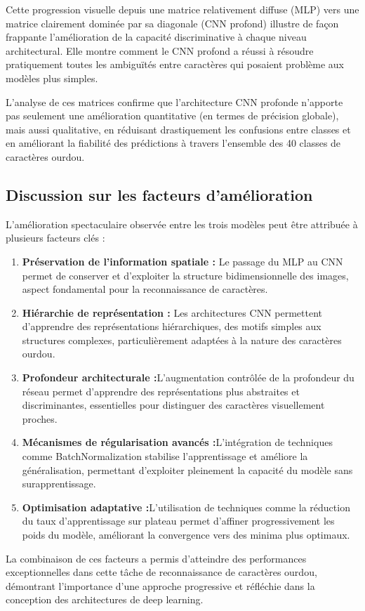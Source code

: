 \begin{flushleft}
\bigskip 

Cette progression visuelle depuis une matrice relativement diffuse (MLP) vers une matrice clairement dominée par sa diagonale (CNN profond) illustre de façon frappante l'amélioration de la capacité discriminative à chaque niveau architectural. Elle montre comment le CNN profond a réussi à résoudre pratiquement toutes les ambiguïtés entre caractères qui posaient problème aux modèles plus simples.

L'analyse de ces matrices confirme que l'architecture CNN profonde n'apporte pas seulement une amélioration quantitative (en termes de précision globale), mais aussi qualitative, en réduisant drastiquement les confusions entre classes et en améliorant la fiabilité des prédictions à travers l'ensemble des 40 classes de caractères ourdou.
\end{flushleft}

\subsection{Discussion sur les facteurs d'amélioration}

\begin{flushleft}
L'amélioration spectaculaire observée entre les trois modèles peut être attribuée à plusieurs facteurs clés :

\begin{enumerate}
\item \textbf{Préservation de l'information spatiale :} Le passage du MLP au CNN permet de conserver et d'exploiter la structure bidimensionnelle des images, aspect fondamental pour la reconnaissance de caractères.
\item \textbf{Hiérarchie de représentation : }Les architectures CNN permettent d'apprendre des représentations hiérarchiques, des motifs simples aux structures complexes, particulièrement adaptées à la nature des caractères ourdou.
\item \textbf{Profondeur architecturale :}L'augmentation contrôlée de la profondeur du réseau permet d'apprendre des représentations plus abstraites et discriminantes, essentielles pour distinguer des caractères visuellement proches.
\item \textbf{Mécanismes de régularisation avancés :}L'intégration de techniques comme BatchNormalization stabilise l'apprentissage et améliore la généralisation, permettant d'exploiter pleinement la capacité du modèle sans surapprentissage.
\item \textbf{Optimisation adaptative :}L'utilisation de techniques comme la réduction du taux d'apprentissage sur plateau permet d'affiner progressivement les poids du modèle, améliorant la convergence vers des minima plus optimaux.
\end{enumerate}

\bigskip

La combinaison de ces facteurs a permis d'atteindre des performances exceptionnelles dans cette tâche de reconnaissance de caractères ourdou, démontrant l'importance d'une approche progressive et réfléchie dans la conception des architectures de deep learning.
\end{flushleft}

